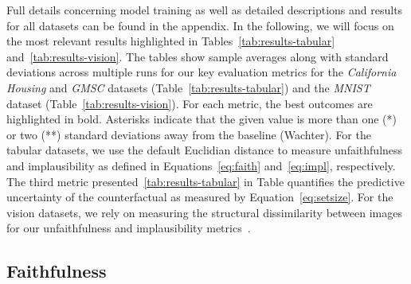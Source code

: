 \documentclass[letterpaper]{article} %
\begin{document}
Full details concerning model training as well as detailed descriptions and results for all datasets can be found in the appendix. In the following, we will focus on the most relevant results highlighted in Tables~\ref{tab:results-tabular} and~\ref{tab:results-vision}. The tables show sample averages along with standard deviations across multiple runs for our key evaluation metrics for the \textit{California Housing} and \textit{GMSC} datasets (Table~\ref{tab:results-tabular}) and the \textit{MNIST} dataset (Table~\ref{tab:results-vision}). For each metric, the best outcomes are highlighted in bold. Asterisks indicate that the given value is more than one (*) or two (**) standard deviations away from the baseline (Wachter). For the tabular datasets, we use the default Euclidian distance to measure unfaithfulness and implausibility as defined in Equations~\ref{eq:faith} and~\ref{eq:impl}, respectively. The third metric presented~\ref{tab:results-tabular} in Table quantifies the predictive uncertainty of the counterfactual as measured by Equation~\ref{eq:setsize}. For the vision datasets, we rely on measuring the structural dissimilarity between images for our unfaithfulness and implausibility metrics~\citep{wang2003multiscale}. 

\subsection{Faithfulness}
\end{document}
